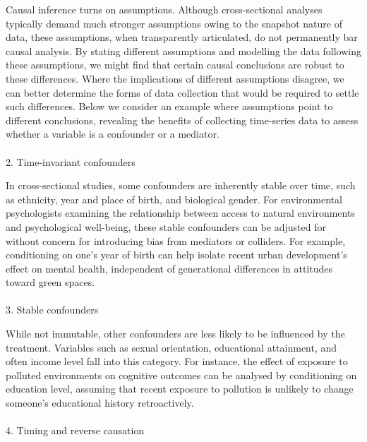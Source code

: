 \documentclass[
  single column]{article}
\makeatletter
\let\oldparagraph\paragraph
\renewcommand{\paragraph}{
    \@ifstar
      \xxxParagraphStar
      \xxxParagraphNoStar
  }
\newcommand{\xxxParagraphStar}[1]{\oldparagraph*{#1}\mbox{}}
\newcommand{\xxxParagraphNoStar}[1]{\oldparagraph{#1}\mbox{}}
\makeatother
\begin{document}
Causal inference turns on assumptions. Although cross-sectional analyses
typically demand much stronger assumptions owing to the snapshot nature
of data, these assumptions, when transparently articulated, do not
permanently bar causal analysis. By stating different assumptions and
modelling the data following these assumptions, we might find that
certain causal conclusions are robust to these differences. Where the
implications of different assumptions disagree, we can better determine
the forms of data collection that would be required to settle such
differences. Below we consider an example where assumptions point to
different conclusions, revealing the benefits of collecting time-series
data to assess whether a variable is a confounder or a mediator.

\paragraph{2. Time-invariant
confounders}\label{time-invariant-confounders}

In cross-sectional studies, some confounders are inherently stable over
time, such as ethnicity, year and place of birth, and biological gender.
For environmental psychologists examining the relationship between
access to natural environments and psychological well-being, these
stable confounders can be adjusted for without concern for introducing
bias from mediators or colliders. For example, conditioning on one's
year of birth can help isolate recent urban development's effect on
mental health, independent of generational differences in attitudes
toward green spaces.

\paragraph{3. Stable confounders}\label{stable-confounders}

While not immutable, other confounders are less likely to be influenced
by the treatment. Variables such as sexual orientation, educational
attainment, and often income level fall into this category. For
instance, the effect of exposure to polluted environments on cognitive
outcomes can be analysed by conditioning on education level, assuming
that recent exposure to pollution is unlikely to change someone's
educational history retroactively.

\paragraph{4. Timing and reverse
causation}\label{timing-and-reverse-causation}
\end{document}
